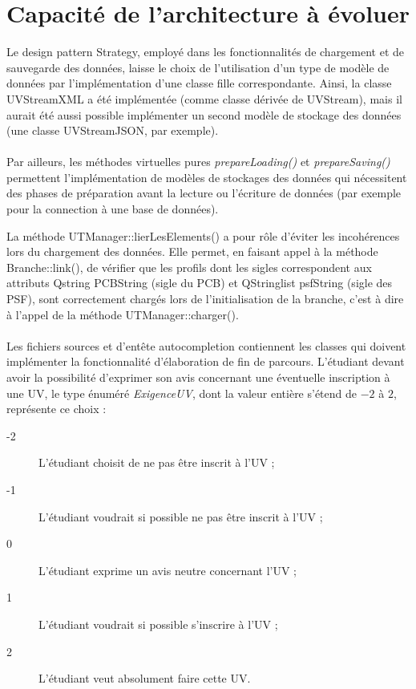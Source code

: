 \documentclass[a4paper,10pt,french]{report}
\begin{document}
        
        
        
\section{Capacité de l'architecture à évoluer}\label{sec:II}

	
	Le design pattern Strategy, employé dans les fonctionnalités de chargement et de sauvegarde des données, laisse le choix de l'utilisation d'un type de modèle de données par l'implémentation d'une classe fille correspondante.
	Ainsi, la classe UVStreamXML a été implémentée (comme classe dérivée de UVStream), mais il aurait été aussi possible implémenter un second modèle de stockage des données (une classe UVStreamJSON, par exemple).\\\\
	Par ailleurs, les méthodes virtuelles pures \emph{prepareLoading()} et \emph{prepareSaving()} permettent l'implémentation de modèles de stockages des données qui nécessitent des phases de préparation avant la lecture ou l'écriture de données (par exemple pour la connection à une base de données).
	
	La méthode UTManager::lierLesElements() a pour rôle d'éviter les incohérences lors du chargement des données.
	Elle permet, en faisant appel à la méthode Branche::link(), de vérifier que les profils dont les sigles correspondent aux attributs Qstring PCBString (sigle du PCB) et QStringlist psfString (sigle des PSF), sont correctement chargés lors de l'initialisation de la branche, c'est à dire à l'appel de la méthode UTManager::charger().\\\\
	
	
	Les fichiers sources et d'entête autocompletion contiennent les classes qui doivent implémenter la fonctionnalité d'élaboration de fin  de parcours.
	L'étudiant devant avoir la possibilité d'exprimer son avis concernant une éventuelle inscription à une UV, le type énuméré \emph{ExigenceUV}, dont la valeur entière s'étend de $-2$ à $2$, représente ce choix : 
	\begin{description}
	\item[-2] L'étudiant choisit de ne pas être inscrit à l'UV ;
	\item[-1] L'étudiant voudrait si possible ne pas être inscrit à l'UV ;	
	\item[0] L'étudiant exprime un avis neutre concernant l'UV ;
	\item[1] L'étudiant voudrait si possible s'inscrire à l'UV ;
	\item[2] L'étudiant veut absolument faire cette UV.
	\end{description}
	
\end{document}
